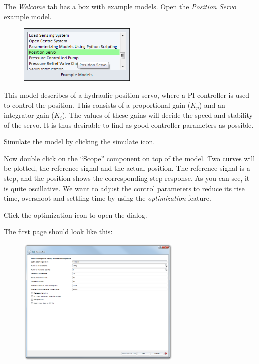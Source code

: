 \documentclass[a4paper,pdftex]{article}
\begin{document}
\begin{tutenumerate}
The \textit{Welcome} tab has a box with example models. Open the \textit{Position Servo} example model.

\FloatBarrier
\begin{figure}[h]
\center
\includegraphics[width=0.5\textwidth]{gfx/optimization/openmodel.png}
\end{figure}
\FloatBarrier

This model describes of a hydraulic position servo, where a PI-controller is used to control the position. This consists of a proportional gain ($K_{p}$) and an integrator gain ($K_{i}$).  The values of these gains will decide the speed and stability of the servo. It is thus desirable to find as good controller parameters as possible.

Simulate the model by clicking the simulate icon.
 

Now double click on the \enquote{Scope} component on top of the model. Two curves will be plotted, the reference signal and the actual position. The reference signal is a step, and the position shows the corresponding step response. As you can see, it is quite oscillative. We want to adjust the control parameters to reduce its rise time, overshoot and settling time by using the \textit{optimization} feature.

Click the optimization icon to open the dialog.


\pagebreak

The first page should look like this:

\FloatBarrier
\begin{figure}[h]
\center
\includegraphics[width=0.7\textwidth]{gfx/optimization/screenshot-opt1.png}
\end{figure}
\FloatBarrier


\end{tutenumerate}
\end{document}
